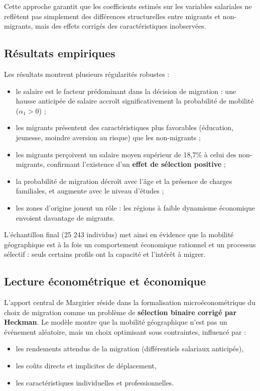 \documentclass[12pt,a4paper]{article}
\begin{document}
Cette approche garantit que les coefficients estimés sur les variables salariales ne reflètent pas simplement des différences structurelles entre migrants et non-migrants, mais des effets corrigés des caractéristiques inobservées.

\subsection{Résultats empiriques}

Les résultats montrent plusieurs régularités robustes :
\begin{itemize}
    \item le salaire est le facteur prédominant dans la décision de migration : une hausse anticipée de salaire accroît significativement la probabilité de mobilité ($\alpha_1 > 0$) ;
    \item les migrants présentent des caractéristiques plus favorables (éducation, jeunesse, moindre aversion au risque) que les non-migrants ;
    \item les migrants perçoivent un salaire moyen supérieur de 18,7\% à celui des non-migrants, confirmant l’existence d’un \textbf{effet de sélection positive} ;
    \item la probabilité de migration décroît avec l’âge et la présence de charges familiales, et augmente avec le niveau d’études ;
    \item les zones d’origine jouent un rôle : les régions à faible dynamisme économique envoient davantage de migrants.
\end{itemize}

L’échantillon final (25 243 individus) met ainsi en évidence que la mobilité géographique est à la fois un comportement économique rationnel et un processus sélectif : seuls certains profils ont la capacité et l’intérêt à migrer.

\newpage

\subsection{Lecture économétrique et économique}

L’apport central de Margirier réside dans la formalisation microéconométrique du choix de migration comme un problème de \textbf{sélection binaire corrigé par Heckman}.  
Le modèle montre que la mobilité géographique n’est pas un événement aléatoire, mais un choix optimisant sous contraintes, influencé par :
\begin{itemize}
    \item les rendements attendus de la migration (différentiels salariaux anticipés),
    \item les coûts directs et implicites de déplacement,
    \item les caractéristiques individuelles et professionnelles.
\end{itemize}
\end{document}
